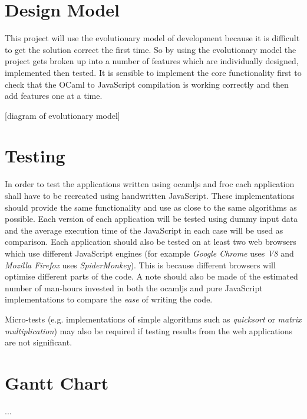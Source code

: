\section{Design Model}
This project will use the evolutionary model of development because it is difficult to get the solution correct the first time. So by using the evolutionary model the project gets broken up into a number of features which are individually designed, implemented then tested. It is sensible to implement the core functionality first to check that the OCaml to JavaScript compilation is working correctly and then add features one at a time.

[diagram of evolutionary model]

\section{Testing}
In order to test the applications written using ocamljs and froc each application shall have to be recreated using handwritten JavaScript. These implementations should provide the same functionality and use as close to the same algorithms as possible. Each version of each application will be tested using dummy input data and the average execution time of the JavaScript in each case will be used as comparison. Each application should also be tested on at least two web browsers which use different JavaScript engines (for example \emph{Google Chrome} uses \emph{V8} and \emph{Mozilla Firefox} uses \emph{SpiderMonkey}). This is because different browsers will optimise different parts of the code. A note should also be made of the estimated number of man-hours invested in both the ocamljs and pure JavaScript implementations to compare the \emph{ease} of writing the code.

Micro-tests (e.g. implementations of simple algorithms such as \emph{quicksort} or \emph{matrix multiplication}) may also be required if testing results from the web applications are not significant.

\section{Gantt Chart}
...



